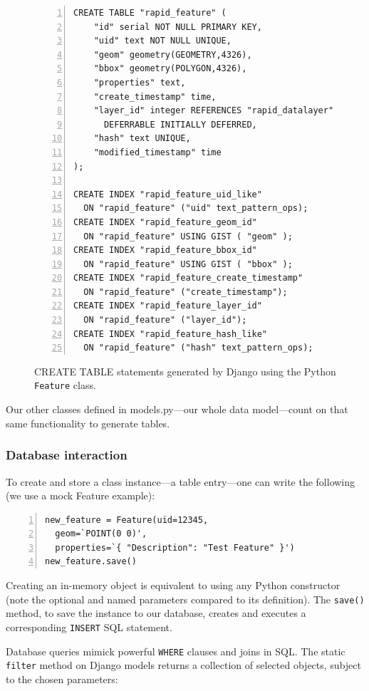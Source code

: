\begin{figure}
\begin{Verbatim}[samepage=true,baselinestretch=1,numbers=left,xleftmargin=12mm]
CREATE TABLE "rapid_feature" (
    "id" serial NOT NULL PRIMARY KEY,
    "uid" text NOT NULL UNIQUE,
    "geom" geometry(GEOMETRY,4326),
    "bbox" geometry(POLYGON,4326),
    "properties" text,
    "create_timestamp" time,
    "layer_id" integer REFERENCES "rapid_datalayer" ("id")
      DEFERRABLE INITIALLY DEFERRED,
    "hash" text UNIQUE,
    "modified_timestamp" time
);

CREATE INDEX "rapid_feature_uid_like"
  ON "rapid_feature" ("uid" text_pattern_ops);
CREATE INDEX "rapid_feature_geom_id"
  ON "rapid_feature" USING GIST ( "geom" );
CREATE INDEX "rapid_feature_bbox_id"
  ON "rapid_feature" USING GIST ( "bbox" );
CREATE INDEX "rapid_feature_create_timestamp"
  ON "rapid_feature" ("create_timestamp");
CREATE INDEX "rapid_feature_layer_id"
  ON "rapid_feature" ("layer_id");
CREATE INDEX "rapid_feature_hash_like"
  ON "rapid_feature" ("hash" text_pattern_ops);
\end{Verbatim}
\caption{CREATE TABLE statements generated by Django using the Python \texttt{Feature} class.}
\label{fig:sql}
\end{figure}

Our other classes defined in models.py---our whole data model---count on that same functionality to generate tables.

\subsubsection{Database interaction}
To create and store a class instance---a table entry---one can write the following (we use a mock Feature example):

\begin{Verbatim}[samepage=true,baselinestretch=1,numbers=left,xleftmargin=12mm]
new_feature = Feature(uid=12345,
  geom=`POINT(0 0)',
  properties=`{ "Description": "Test Feature" }')
new_feature.save()
\end{Verbatim}

Creating an in-memory object is equivalent to using any Python constructor (note the optional and named parameters compared to its definition). The \texttt{save()} method, to save the instance to our database, creates and executes a corresponding \texttt{INSERT} SQL statement.

Database queries mimick powerful \texttt{WHERE} clauses and joins in SQL. The static \texttt{filter} method on Django models returns a collection of selected objects, subject to the chosen parameters:

